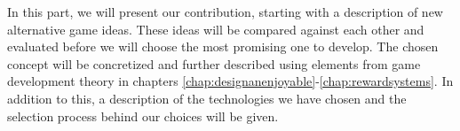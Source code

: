 In this part, we will present our contribution, starting with a description of new alternative game ideas. These ideas will be compared against each other and evaluated before we will choose the most promising one to develop. The chosen concept will be concretized and further described using elements from game development theory in chapters \ref{chap:designanenjoyable}-\ref{chap:rewardsystems}. In addition to this, a description of the technologies we have chosen and the selection process behind our choices will be given.

\clearpage


\clearpage


\clearpage


\clearpage


\clearpage